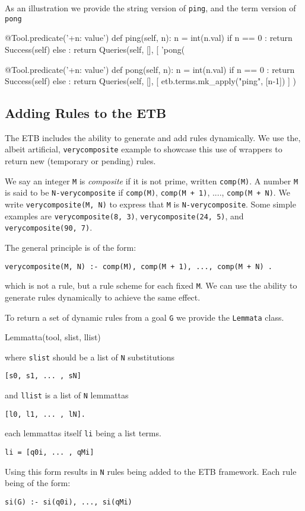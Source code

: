 \documentclass{article}
\begin{document}
As an illustration we provide the string version of {\tt ping},
and the term version of {\tt pong}

\begin{pythoncode}
@Tool.predicate('+n: value')
def ping(self, n):
    n = int(n.val)
    if n == 0 :
        return Success(self)
    else :
        return Queries(self, [{}], [ 'pong(%
\end{pythoncode}

\begin{pythoncode}
@Tool.predicate('+n: value')
def pong(self, n):
    n = int(n.val)
    if n == 0 :
        return Success(self)
    else :
        return Queries(self, [{}], [ etb.terms.mk_apply("ping", [n-1]) ] )
\end{pythoncode}




\subsection{Adding Rules to the ETB}

The ETB includes the ability to generate and add rules dynamically.
We use the, albeit artificial, {\tt verycomposite} example to showcase this
use of wrappers to return new (temporary or pending) rules. 

We say an integer {\tt M} is {\em composite} if it is not prime, written
{\tt comp(M)}.
A number {\tt M} is said to be {\tt N-verycomposite}  if
{\tt comp(M)}, {\tt comp(M + 1)}, ...., {\tt comp(M + N)}.
We write  {\tt verycomposite(M, N)} to express that {\tt M} is  {\tt N-verycomposite}.
Some simple examples are 
{\tt verycomposite(8, 3)}, {\tt verycomposite(24, 5)}, and 
{\tt verycomposite(90, 7)}.

The general principle is of the form:
\begin{verbatim}
verycomposite(M, N) :- comp(M), comp(M + 1), ..., comp(M + N) .
\end{verbatim}
which is not a rule, but a rule scheme for each fixed {\tt M}. We can use the
ability to generate rules dynamically to achieve the same effect.

To return a set of dynamic rules from a goal {\tt G} we provide the {\tt Lemmata} class.
\begin{pythoncode}
  Lemmatta(tool, slist, llist)
\end{pythoncode}
where  {\tt slist} should be a list of {\tt N} substitutions
\begin{verbatim}
[s0, s1, ... , sN]
\end{verbatim}
and {\tt llist} is a list of {\tt N} lemmattas
\begin{verbatim}
[l0, l1, ... , lN].
\end{verbatim}
each lemmattas itself {\tt li} being a list terms. 
\begin{verbatim}
li = [q0i, ... , qMi]
\end{verbatim}
Using this form results in {\tt N} rules being added to the ETB framework.
Each rule being of the form:
\begin{verbatim}
si(G) :- si(q0i), ..., si(qMi)
\end{verbatim}
\end{document}

